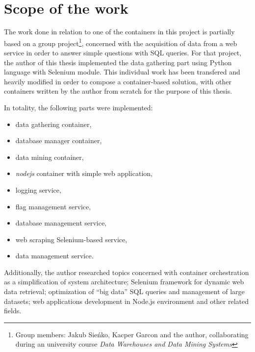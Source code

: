 \section{Scope of the work}
The work done in relation to one of the containers in this project is partially based on a group project\footnote{Group members: Jakub Sieńko, Kacper Garcon and the author, collaborating during an university course \textit{Data Warehouses and Data Mining Systems}}, concerned with the acquisition of data from a web service in order to answer simple questions with SQL queries. For that project, the author of this thesis implemented the data gathering part using Python language with Selenium module. This individual work has been transfered and heavily modified in order to compose a container-based solution, with other containers written by the author from scratch for the purpose of this thesis. \par
In totality, the following parts were implemented:
\begin{itemize}
    \item data gathering container,
    \item database manager container,
    \item data mining container,
    \item \textit{nodejs} container with simple web application,
    \item logging service,
    \item flag management service,
    \item database management service,
    \item web scraping Selenium-based service,
    \item data management service.
\end{itemize}
Additionally, the author researched topics concerned with container orchestration as a simplification of system architecture; Selenium framework for dynamic web data retrieval; optimization of ``big data'' SQL queries and management of large datasets; web applications development in Node.js environment and other related fields.



